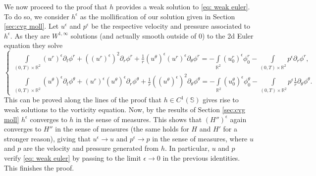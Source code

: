 \documentclass[10pt]{article}
\theoremstyle{definition}
\theoremstyle{remark}
\numberwithin{equation}{section}
\newcommand{\0}{\emptyset}
\newcommand{\eps}{\epsilon}
\newcommand{\bbS}{\mathbb S}
\begin{document}
     \noindent We now proceed to the proof that $h$ provides a weak solution to \eqref{eq: weak euler}. To do so, we  consider $h^\epsilon$ as the mollification of our solution given in Section \ref{sec:cvg moll}. Let $u^\epsilon$ and $p^\epsilon$ be the respective velocity and pressure associated to $h^\epsilon$. As they are $W^{1,\infty}$ solutions (and actually smooth outside of $0$) to the 2d Euler equation they solve
     \[
    \begin{cases}		\int\limits_{(0,T)\times\mathbb{R}^2}\left(u^r \right)^\epsilon\partial_t\phi^r+\left((u^r)^\epsilon\right)^2 \partial_r \phi^r+\frac{1}{r}(u^\theta)^{\epsilon} (u^r)^{\epsilon} \partial_\theta \phi^r=-\int\limits_{\mathbb{R}^2}(u^r_0)^{\epsilon}\phi^r_0-\int\limits_{(0,T)\times\mathbb{R}^2} p^\epsilon \partial_r \phi^r,\\
		\int\limits_{(0,T)\times\mathbb{R}^2}(u^\theta)^{\epsilon} \partial_t\phi^\theta+(u^r)^{\epsilon} (u^\theta)^{\epsilon} \partial_r \phi^\theta+\frac{1}{r}\left((u^\theta)^{\epsilon}\right)^2 \partial_\theta \phi^\theta=-\int\limits_{\mathbb{R}^2}(u^\theta_0)^\epsilon \phi^\theta_0-\int\limits_{(0,T)\times\mathbb{R}^2} p^\epsilon \frac{1}{r}\partial_\theta \phi^\theta.
	\end{cases}
	\] This can be proved along the lines of the proof that $h \in C^1(\bbS)$ gives rise to weak solutions to the vorticity equation. 
 Now, by the results of Section \ref{sec:cvg moll} $h^\epsilon$ converges to $h$ in the sense of measures. This shows that $(H'')^\epsilon$ again converges to $H''$ in the sense of measures (the same holds for $H$ and $H'$ for a stronger reason), giving that $u^\epsilon \to u$ and $p^\epsilon \to p$ in the sense of measures, where $u$ and $p$ are the velocity and pressure generated from $h$. In particular, $u$ and $p$ verify \eqref{eq: weak euler} by passing to the limit $\eps\to 0$ in the previous identities. This finishes the proof. \qedsymbol 
 
\end{document}
